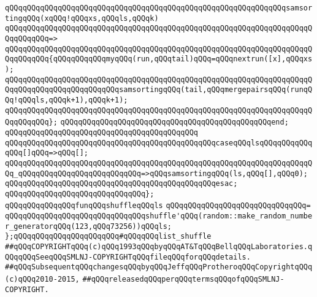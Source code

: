 \newline
\verb|qQQqqQQqqQQqqQQqqQQqqQQqqQQqqQQqqQQqqQQqqQQqqQQqqQQqqQQqqQQqqQQqsamsortingqQQq(xqQQq!qQQqxs,qQQqls,qQQqk)|\newline
\verb|qQQqqQQqqQQqqQQqqQQqqQQqqQQqqQQqqQQqqQQqqQQqqQQqqQQqqQQqqQQqqQQqqQQqqQQqqQQqqQQq=>|\newline
\verb|qQQqqQQqqQQqqQQqqQQqqQQqqQQqqQQqqQQqqQQqqQQqqQQqqQQqqQQqqQQqqQQqqQQqqQQqqQQqqQQq{qQQqqQQqqQQqmyqQQq(run,qQQqtail)qQQq=qQQqnextrun([x],qQQqxs);|\newline
\verb|qQQqqQQqqQQqqQQqqQQqqQQqqQQqqQQqqQQqqQQqqQQqqQQqqQQqqQQqqQQqqQQqqQQqqQQqqQQqqQQqqQQqqQQqqQQqqQQqsamsortingqQQq(tail,qQQqmergepairsqQQq(runqQQq!qQQqls,qQQqk+1),qQQqk+1);|\newline
\verb|qQQqqQQqqQQqqQQqqQQqqQQqqQQqqQQqqQQqqQQqqQQqqQQqqQQqqQQqqQQqqQQqqQQqqQQqqQQqqQQq};|\newline
\verb|qQQqqQQqqQQqqQQqqQQqqQQqqQQqqQQqqQQqqQQqqQQqqQQqend;|\newline
\verb|qQQqqQQqqQQqqQQqqQQqqQQqqQQqqQQqqQQqqQQqqQQq|\newline
\verb|qQQqqQQqqQQqqQQqqQQqqQQqqQQqqQQqqQQqqQQqqQQqqQQqcaseqQQqlsqQQqqQQqqQQqqQQq[]qQQq=>qQQq[];|\newline
\verb|qQQqqQQqqQQqqQQqqQQqqQQqqQQqqQQqqQQqqQQqqQQqqQQqqQQqqQQqqQQqqQQqqQQqqQQq_qQQqqQQqqQQqqQQqqQQqqQQqqQQq=>qQQqsamsortingqQQq(ls,qQQq[],qQQq0);|\newline
\verb|qQQqqQQqqQQqqQQqqQQqqQQqqQQqqQQqqQQqqQQqqQQqqQQqesac;|\newline
\verb|qQQqqQQqqQQqqQQqqQQqqQQqqQQqqQQq};|\newline
\newline
\verb|qQQqqQQqqQQqqQQqfunqQQqshuffleqQQqls|\newline
\verb|qQQqqQQqqQQqqQQqqQQqqQQqqQQqqQQq=|\newline
\verb|qQQqqQQqqQQqqQQqqQQqqQQqqQQqqQQqshuffle'qQQq(random::make_random_number_generatorqQQq(123,qQQq73256))qQQqls;|\newline
\newline
\newline
\verb|};qQQqqQQqqQQqqQQqqQQqqQQq#qQQqqQQqlist_shuffle|\newline
\newline
\newline
\verb|##qQQqCOPYRIGHTqQQq(c)qQQq1993qQQqbyqQQqAT&TqQQqBellqQQqLaboratories.qQQqqQQqSeeqQQqSMLNJ-COPYRIGHTqQQqfileqQQqforqQQqdetails.|\newline
\verb|##qQQqSubsequentqQQqchangesqQQqbyqQQqJeffqQQqProtheroqQQqCopyrightqQQq(c)qQQq2010-2015,|\newline
\verb|##qQQqreleasedqQQqperqQQqtermsqQQqofqQQqSMLNJ-COPYRIGHT.|\newline

